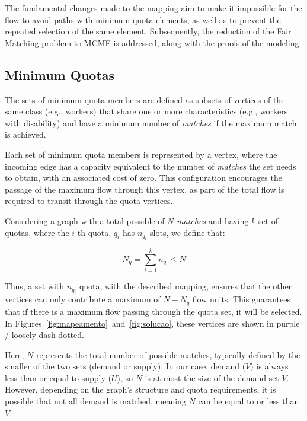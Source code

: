             The fundamental changes made to the mapping aim to make it impossible for the flow to avoid paths with minimum quota elements, as well as to prevent the repeated selection of the same element.
            Subsequently, the reduction of the Fair Matching problem to MCMF is addressed, along with the proofs of the modeling.
            
            \subsection{Minimum Quotas}
            
                The sets of minimum quota members are defined as subsets of vertices of the same class (e.g., workers) that share one or more characteristics (e.g., workers with disability) and have a minimum number of \textit{matches} if the maximum match is achieved.
                
                Each set of minimum quota members is represented by a vertex, where the incoming edge has a capacity equivalent to the number of \textit{matches} the set needs to obtain, with an associated cost of zero. This configuration encourages the passage of the maximum flow through this vertex, as part of the total flow is required to transit through the quota vertices.
                
                Considering a graph with a total possible of $N$ \textit{matches} and having $k$ set of quotas, where the \( i \)-th quota, $q_i$ has $n_{q_i}$ slots, we define that:
                
                {\centering
                    \[
                    N_q = \sum_{i=1}^{k} n_{q_i} \leq N
                    \]
                }
                
                Thus, a set with $n_{q_i}$ quota, with the described mapping, ensures that the other vertices can only contribute a maximum of $N - N_q$ flow units. This guarantees that if there is a maximum flow passing through the quota set, it will be selected.
                In Figures~\ref{fig:mapeamento}~and~\ref{fig:solucao}, these vertices are shown in purple / loosely dash-dotted.
                
                Here, \( N \) represents the total number of possible matches, typically defined by the smaller of the two sets (demand or supply). In our case, demand (\( V \)) is always less than or equal to supply (\( U \)), so \( N \) is at most the size of the demand set \( V \). However, depending on the graph's structure and quota requirements, it is possible that not all demand is matched, meaning \( N \) can be equal to or less than \( V \).
        
